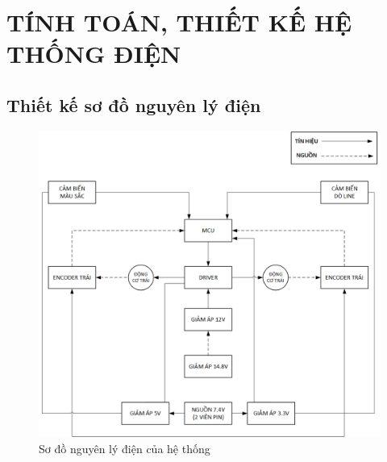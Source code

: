 \chapter{TÍNH TOÁN, THIẾT KẾ HỆ THỐNG ĐIỆN}
    \section{Thiết kế sơ đồ nguyên lý điện}
        \begin{figure}[H]
            \centering
            \includegraphics[width=1\textwidth]{pictures/chapter4/c4_p1_ElectricalFlow.png}
            \caption{Sơ đồ nguyên lý điện của hệ thống}
            \label{fig:4-1}
        \end{figure}
